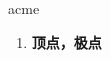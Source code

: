 
\begin{frame}
{\huge acme}
\begin{center}
\begin{enumerate}\Large
  \item \textbf{顶点，极点}
\end{enumerate}
\end{center}
\end{frame}
